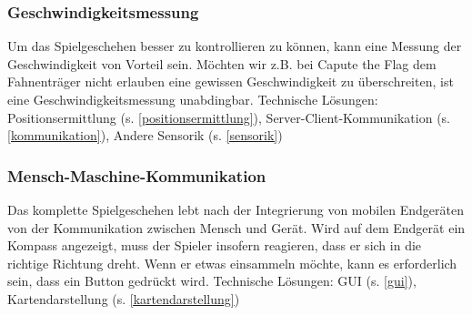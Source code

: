 \subsubsection{Geschwindigkeitsmessung}
Um das Spielgeschehen besser zu kontrollieren zu können, kann eine Messung der
Geschwindigkeit von Vorteil sein. Möchten wir z.B. bei Capute the Flag dem Fahnenträger
nicht erlauben eine gewissen Geschwindigkeit zu überschreiten, ist eine
Geschwindigkeitsmessung unabdingbar.
\newline
Technische Lösungen:
Positionsermittlung (s. \ref{positionsermittlung}), Server-Client-Kommunikation (s. \ref{kommunikation}), Andere Sensorik (s. \ref{sensorik})


\subsubsection{Mensch-Maschine-Kommunikation}
Das komplette Spielgeschehen lebt nach der Integrierung von mobilen Endgeräten von der Kommunikation zwischen Mensch und Gerät. Wird auf dem Endgerät ein Kompass angezeigt, muss der Spieler insofern reagieren, dass er sich in die richtige Richtung dreht.
Wenn er etwas einsammeln möchte, kann es erforderlich sein, dass ein Button gedrückt
wird.
\newline
Technische Lösungen:
GUI (s. \ref{gui}), Kartendarstellung (s. \ref{kartendarstellung})
